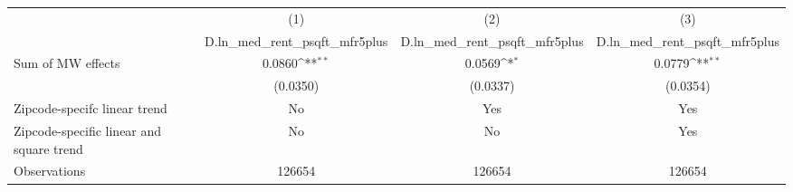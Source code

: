 {
\def\sym#1{\ifmmode^{#1}\else\(^{#1}\)\fi}
\begin{tabular}{l*{3}{c}}
\hline\hline
          &\multicolumn{1}{c}{(1)}&\multicolumn{1}{c}{(2)}&\multicolumn{1}{c}{(3)}\\
          &\multicolumn{1}{c}{D.ln\_med\_rent\_psqft\_mfr5plus}&\multicolumn{1}{c}{D.ln\_med\_rent\_psqft\_mfr5plus}&\multicolumn{1}{c}{D.ln\_med\_rent\_psqft\_mfr5plus}\\
\hline
Sum of MW effects&   0.0860\sym{**} &   0.0569\sym{*}  &   0.0779\sym{**} \\
          & (0.0350)         & (0.0337)         & (0.0354)         \\
\hline
Zipcode-specifc linear trend&       No         &      Yes         &      Yes         \\
Zipcode-specific linear and square trend&       No         &       No         &      Yes         \\
Observations&   126654         &   126654         &   126654         \\
\hline\hline
\end{tabular}
}

